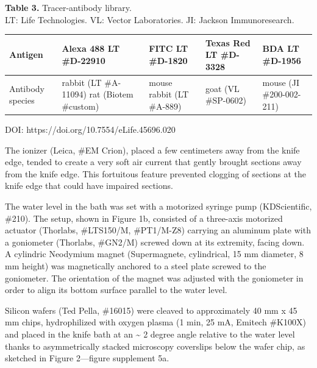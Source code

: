 \documentclass{article}
\begin{document}
\medskip
\noindent\textbf{Table 3.} Tracer-antibody library.\\
LT: Life Technologies. VL: Vector Laboratories. JI: Jackson Immunoresearch.\par\nopagebreak
{\small\noindent\begin{tabular}{@{}p{2.6cm}p{3.0cm}p{2.8cm}p{2.6cm}p{2.6cm}@{}}
\toprule
\textbf{Antigen} & \textbf{Alexa 488 LT \#D-22910} & \textbf{FITC LT \#D-1820} & \textbf{Texas Red LT \#D-3328} & \textbf{BDA LT \#D-1956} \\
\midrule
Antibody species & rabbit (LT \#A-11094) rat (Biotem \#custom) & mouse rabbit (LT \#A-889) & goat (VL \#SP-0602) & mouse (JI \#200-002-211) \\
\bottomrule
\end{tabular}}

\noindent DOI: https://doi.org/10.7554/eLife.45696.020

The ionizer (Leica, \#EM Crion), placed a few centimeters away from the knife edge, tended to create a very soft air current that gently brought sections away from the knife edge. This fortuitous feature prevented clogging of sections at the knife edge that could have impaired sections.

The water level in the bath was set with a motorized syringe pump (KDScientific, \#210). The setup, shown in Figure 1b, consisted of a three-axis motorized actuator (Thorlabs, \#LTS150/M, \#PT1/M-Z8) carrying an aluminum plate with a goniometer (Thorlabs, \#GN2/M) screwed down at its extremity, facing down. A cylindric Neodymium magnet (Supermagnete, cylindrical, 15 mm diameter, 8 mm height) was magnetically anchored to a steel plate screwed to the goniometer. The orientation of the magnet was adjusted with the goniometer in order to align its bottom surface parallel to the water level.

Silicon wafers (Ted Pella, \#16015) were cleaved to approximately 40 mm x 45 mm chips, hydrophilized with oxygen plasma (1 min, 25 mA, Emitech \#K100X) and placed in the knife bath at an \textasciitilde{} 2 degree angle relative to the water level thanks to asymmetrically stacked microscopy coverslips below the wafer chip, as sketched in Figure 2---figure supplement 5a.
\end{document}
